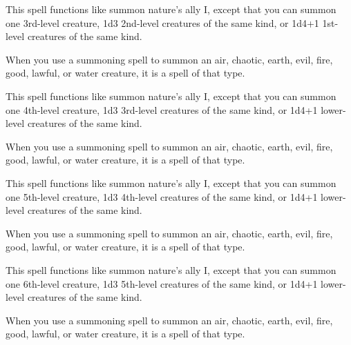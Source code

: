 \begin{multicols}{2}
\begin{small}
\noindent This spell functions like summon nature's ally I, except that you can summon one 3rd-level creature, 1d3 2nd-level creatures of the same kind, or 1d4+1 1st-level creatures of the same kind.

\smallskip\noindent When you use a summoning spell to summon an air, chaotic, earth, evil, fire, good, lawful, or water creature, it is a spell of that type. 

\noindent This spell functions like summon nature's ally I, except that you can summon one 4th-level creature, 1d3 3rd-level creatures of the same kind, or 1d4+1 lower-level creatures of the same kind.

\smallskip\noindent When you use a summoning spell to summon an air, chaotic, earth, evil, fire, good, lawful, or water creature, it is a spell of that type.

\noindent This spell functions like summon nature's ally I, except that you can summon one 5th-level creature, 1d3 4th-level creatures of the same kind, or 1d4+1 lower-level creatures of the same kind.

\smallskip\noindent When you use a summoning spell to summon an air, chaotic, earth, evil, fire, good, lawful, or water creature, it is a spell of that type.

\noindent This spell functions like summon nature's ally I, except that you can summon one 6th-level creature, 1d3 5th-level creatures of the same kind, or 1d4+1 lower-level creatures of the same kind.

\smallskip\noindent When you use a summoning spell to summon an air, chaotic, earth, evil, fire, good, lawful, or water creature, it is a spell of that type.


\end{small}
\end{multicols}
